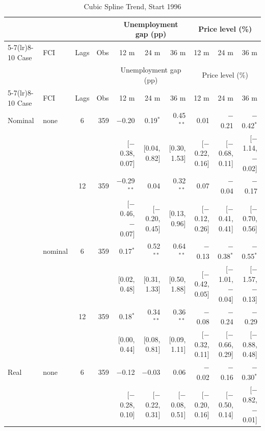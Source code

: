 \begingroup\scriptsize\setlength{\tabcolsep}{0.9pt}
\begin{longtable}{llcrrrrrrr}
\caption{Cubic Spline Trend, Start 1996}\label{tab:appF2}\\
\toprule
 & & & & \multicolumn{3}{c}{Unemployment gap (pp)} & \multicolumn{3}{c}{Price level (\%)}\\ \cmidrule(lr){5-7}\cmidrule(lr){8-10}
Case & FCI & Lags & Obs & 12 m & 24 m & 36 m & 12 m & 24 m & 36 m\\
\midrule\endfirsthead
\toprule
 & & & & \multicolumn{3}{c}{Unemployment gap (pp)} & \multicolumn{3}{c}{Price level (\%)}\\ \cmidrule(lr){5-7}\cmidrule(lr){8-10}
Case & FCI & Lags & Obs & 12 m & 24 m & 36 m & 12 m & 24 m & 36 m\\
\midrule\endhead
\bottomrule\endfoot
Nominal & none & 6 & 359 & $-$0.20 & 0.19$^{*}$ & 0.45$^{**}$ & 0.01 & $-$0.21 & $-$0.42$^{*}$\\
 & & & & {\scriptsize [$-$0.38, 0.07]} & {\scriptsize [0.04, 0.82]} & {\scriptsize [0.30, 1.53]} & {\scriptsize [$-$0.22, 0.16]} & {\scriptsize [$-$0.68, 0.11]} & {\scriptsize [$-$1.14, $-$0.02]}\\
 &  & 12 & 359 & $-$0.29$^{**}$ & 0.04 & 0.32$^{**}$ & 0.07 & $-$0.04 & $-$0.17\\
 & & & & {\scriptsize [$-$0.46, $-$0.07]} & {\scriptsize [$-$0.20, 0.45]} & {\scriptsize [0.13, 0.96]} & {\scriptsize [$-$0.12, 0.26]} & {\scriptsize [$-$0.41, 0.41]} & {\scriptsize [$-$0.70, 0.56]}\\
 & nominal & 6 & 359 & 0.17$^{*}$ & 0.52$^{**}$ & 0.64$^{**}$ & $-$0.13 & $-$0.38$^{*}$ & $-$0.55$^{*}$\\
 & & & & {\scriptsize [0.02, 0.48]} & {\scriptsize [0.31, 1.33]} & {\scriptsize [0.50, 1.88]} & {\scriptsize [$-$0.42, 0.05]} & {\scriptsize [$-$1.01, $-$0.04]} & {\scriptsize [$-$1.57, $-$0.13]}\\
 &  & 12 & 359 & 0.18$^{*}$ & 0.34$^{**}$ & 0.36$^{**}$ & $-$0.08 & $-$0.24 & $-$0.29\\
 & & & & {\scriptsize [0.00, 0.44]} & {\scriptsize [0.08, 0.81]} & {\scriptsize [0.09, 1.11]} & {\scriptsize [$-$0.32, 0.11]} & {\scriptsize [$-$0.66, 0.29]} & {\scriptsize [$-$0.88, 0.48]}\\
\addlinespace
Real & none & 6 & 359 & $-$0.12 & $-$0.03 & 0.06 & $-$0.02 & $-$0.16 & $-$0.30$^{*}$\\
 & & & & {\scriptsize [$-$0.28, 0.10]} & {\scriptsize [$-$0.22, 0.31]} & {\scriptsize [$-$0.08, 0.51]} & {\scriptsize [$-$0.20, 0.16]} & {\scriptsize [$-$0.50, 0.14]} & {\scriptsize [$-$0.82, $-$0.01]}\\

\end{longtable}

